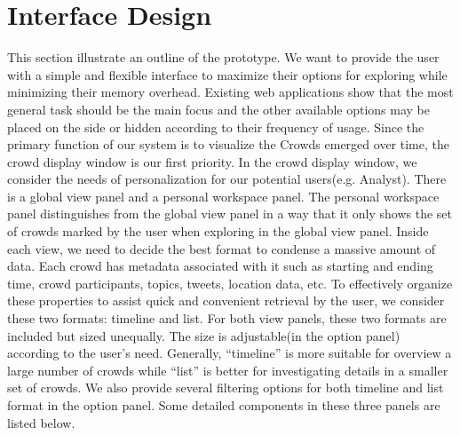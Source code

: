 \documentclass{sig-alternate}
\begin{document}
\section{Interface Design}

This section illustrate an outline of the prototype. We want to provide
the user with a simple and flexible interface to maximize their options for
exploring while minimizing their memory overhead. Existing web applications
show that the most general task should be the main focus and the other
available options may be placed on the side or hidden according to their
frequency of usage. Since the primary function of our system is to visualize
the Crowds emerged over time, the crowd display window is our
first priority. In the crowd display window, we
consider the needs of personalization for our potential users(e.g. Analyst).
There is a global view panel and a personal workspace panel. The personal
workspace panel distinguishes from the global view panel in a way that it only
shows the set of crowds marked by the user when exploring in the global view
panel. Inside each view, we need to decide the best format to condense
a massive amount of data. Each crowd has metadata associated with it such as
starting and ending time, crowd participants, topics, tweets,
location data, etc. To effectively organize these properties to assist quick
and convenient retrieval by the user, we consider these two formats: timeline
and list. For both view panels, these two formats are included but sized
unequally. The size is adjustable(in the option panel) according to the user's
need. Generally, ``timeline'' is more suitable for overview a large number of
crowds while ``list'' is better for investigating details in a smaller set of crowds. We
also provide several filtering options for both timeline and list format in the
option panel. Some detailed components in these three panels are listed below.
\end{document}
